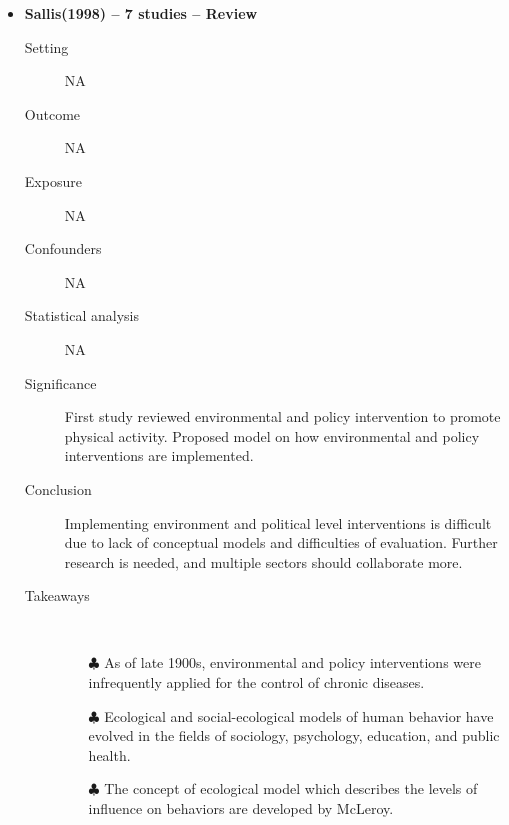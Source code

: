 \documentclass{article}
\begin{document}
\begin{itemize}
\begin{description}
		\end{description}

	\vspace{5mm}
\item{\bf Sallis(1998) -- 7 studies  -- Review} 
		\begin{description}
			\item[Setting] NA 
			\item[Outcome] NA 
			\item[Exposure] NA 
			\item[Confounders] NA 
			\item[Statistical analysis] NA 
			\item[Significance] First study reviewed environmental and policy intervention to promote physical activity. Proposed model on how environmental and policy interventions are implemented.  
			\item[Conclusion] Implementing environment and political level interventions is difficult due to lack of conceptual models and difficulties of evaluation. Further research is needed, and multiple sectors should collaborate more. 
			\item[Takeaways] \mbox{}\\
				\begin{itemize}
					\item[$\clubsuit$] As of late 1900s, environmental and policy interventions were infrequently applied for the control of chronic diseases. 
					\item[$\clubsuit$] Ecological and social-ecological models of human behavior have evolved in the fields of sociology, psychology, education, and public health. 
					\item[$\clubsuit$] The concept of ecological model which describes the levels of influence on behaviors are developed by McLeroy. 
				\end{itemize} 
			
		\end{description}

	\vspace{5mm}



\end{itemize}
\end{document}
